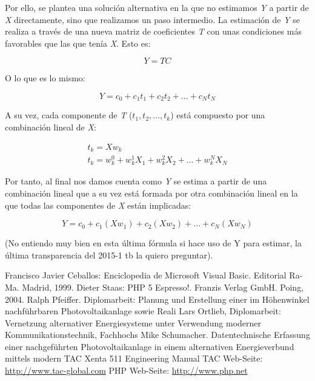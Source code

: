 \documentclass[12pt,a4paper,Spanish]{book}
\begin{document}
Por ello, se plantea una solución alternativa en la que no estimamos \textit{Y} a partir de \textit{X} directamente, sino que realizamos un paso intermedio. La estimación de \textit{Y} se realiza a través de una nueva matriz de coeficientes \textit{T} con unas condiciones más favorables que las que tenía \textit{X}. Esto es:

\begin{equation}
Y = TC
\end{equation}

O lo que es lo mismo:

\begin{equation}
Y = c_0 + c_1t_1 + c_2t_2 + ... + c_Nt_N
\end{equation}

A su vez, cada componente de \textit{T} ($t_1, t_2,..., t_k$) está compuesto por una combinación lineal de \textit{X}:

\begin{equation}
\begin{split} 
t_k = X w_k \\
t_k = w_k^0 + w_k^1 X_1 + w_k^2 X_2 + ... + w_k^N X_N
\end{split} 
\end{equation}

Por tanto, al final nos damos cuenta como \textit{Y} se estima a partir de una combinación lineal que a su vez está formada por otra combinación lineal en la que todas las componentes de \textit{X} están implicadas:

\begin{equation}
Y = c_0 + c_1(X w_1) + c_2(X w_2) + ... + c_N(X w_N)  
\end{equation}

(No entiendo muy bien en esta última fórmula si hace uso de Y para estimar, la última transparencia del 2015-1 tb la quiero preguntar).

\begin{thebibliography}{99}
	 Francisco Javier Ceballos: Enciclopedia de Microsoft 	Visual Basic. Editorial Ra-Ma. Madrid, 1999.
	 Dieter Staas: PHP 5 Espresso!. Franzis Verlag GmbH.
	Poing, 2004.
	 Ralph Pfeiffer. Diplomarbeit: Planung und
	Erstellung einer im Höhenwinkel nachführbaren Photovoltaikanlage
	sowie Reali
	Lars Ortlieb, Diplomarbeit: Vernetzung alternativer
	Energiesysteme unter Verwendung moderner Kommunikationstechnik,
	Fachhochs
	 Mike Schumacher. Datentechnische Erfassung einer
	nachgeführten Photovoltaikanlage in einem alternativen
	Energieverbund mittels modern
	 TAC Xenta 511 Engineering Manual
	 TAC Web-Seite: \url{http://www.tac-global.com}
	 PHP Web-Seite: \url{http://www.php.net}
\end{thebibliography}
\end{document}
